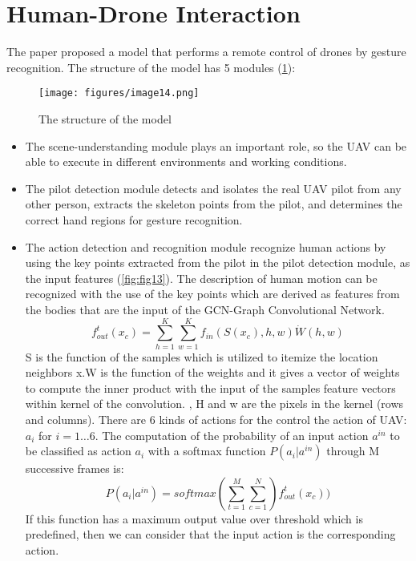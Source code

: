 \documentclass[12pt]{book}
\begin{document}
\section{Human-Drone Interaction}
The paper \cite{HUA2019} proposed a model that performs a remote control of drones by gesture recognition. The structure of the model has 5 modules (\ref{fig:fig12}):

\begin{figure}[!htbp]
\centering
  \texttt{[image: figures/image14.png]}
  \\
  \caption{The structure of the model \cite{HUA2019}}
  \label{fig:fig12}
\end{figure}

\begin{itemize}
    \item The scene-understanding module plays an important role, so the UAV can be able to execute in different environments and working conditions. 

\item The pilot detection module detects and isolates the real UAV pilot from any other person, extracts the skeleton points from the pilot, and determines the correct hand regions for gesture recognition. 

\item The action detection and recognition module recognize human actions by using the key points extracted from the pilot in the pilot detection module, as the input features (\ref{fig:fig13}). The description of human motion can be recognized with the use of the key points which are derived as features from the bodies that are the input of the GCN-Graph Convolutional Network. $$f_{out}^t(x_c)=\sum_{h=1}^K\sum_{w=1}^K f_{in}(S(x_c),h,w)\dot W(h,w)$$
S is the function of the samples which is utilized to itemize the location neighbors x.W is the function of the weights and it gives a vector of weights to compute the inner product with the input of the samples feature vectors within kernel of the convolution. 
, H and w are the pixels in the kernel (rows and columns). There are 6 kinds of actions for the control the action of UAV: $a_i$ for $i=1 \dots 6$.
The computation of the probability of an input action $a^{in}$ to be classified as action $a_i$ with a softmax function $P(a_i|a^{in})$ through M successive frames is: $$P(a_i|a^{in})=softmax(\sum_{t=1}^M\sum_{c=1}^N) f_{out}^t(x_c))$$ If this function has a maximum output value over threshold which is predefined, then we can consider that the input action is the corresponding action.
\end{itemize}
\end{document}
